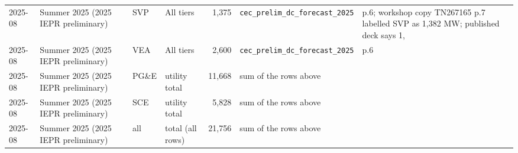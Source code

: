 \begin{tabular}{lp{3.2cm}lp{3.4cm}rp{4.2cm}p{5cm}}
2025-08 & Summer 2025 (2025 IEPR preliminary) & SVP & All tiers & 1,375 & \texttt{cec\_\allowbreak{}prelim\_\allowbreak{}dc\_\allowbreak{}forecast\_\allowbreak{}2025} & p.6; workshop copy TN267165 p.7 labelled SVP as 1,382 MW; published deck says 1, \\
2025-08 & Summer 2025 (2025 IEPR preliminary) & VEA & All tiers & 2,600 & \texttt{cec\_\allowbreak{}prelim\_\allowbreak{}dc\_\allowbreak{}forecast\_\allowbreak{}2025} & p.6 \\
2025-08 & Summer 2025 (2025 IEPR preliminary) & PG\&E & utility total & 11,668 & sum of the rows above & \\
2025-08 & Summer 2025 (2025 IEPR preliminary) & SCE & utility total & 5,828 & sum of the rows above & \\
2025-08 & Summer 2025 (2025 IEPR preliminary) & all & total (all rows) & 21,756 & sum of the rows above &  \\
\bottomrule
\end{tabular}